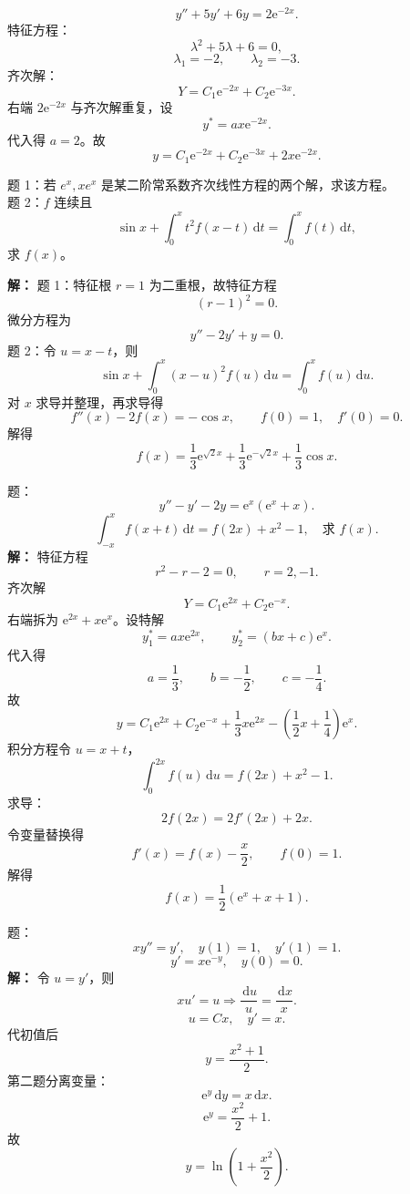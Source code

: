 \documentclass[11pt,a4paper,UTF8]{ctexart}
\newcommand{\dd}{\,\mathrm d}
\newcommand{\ee}{\mathrm e}
\begin{document}
\begin{answerbox}[例：2024--2025]
\[
y''+5y'+6y=2\ee^{-2x}.
\]
特征方程：
\[
\lambda^2+5\lambda+6=0,
\]
\[
\lambda_1=-2,\qquad \lambda_2=-3.
\]
齐次解：
\[
Y=C_1\ee^{-2x}+C_2\ee^{-3x}.
\]
右端 \(2\ee^{-2x}\) 与齐次解重复，设
\[
y^*=ax\ee^{-2x}.
\]
代入得 \(a=2\)。故
\[
\boxed{y=C_1\ee^{-2x}+C_2\ee^{-3x}+2x\ee^{-2x}.}
\]
\end{answerbox}

\newpage

\begin{answerbox}[2020--2021 简答 6 与积分方程大题]
题 1：若 \(e^x,xe^x\) 是某二阶常系数齐次线性方程的两个解，求该方程。\\
题 2：\(f\) 连续且
\[
\sin x+\int_0^x t^2f(x-t)\dd t=\int_0^x f(t)\dd t,
\]
求 \(f(x)\)。

\textbf{解：}
题 1：特征根 \(r=1\) 为二重根，故特征方程
\[
(r-1)^2=0.
\]
微分方程为
\[
\boxed{y''-2y'+y=0}.
\]
题 2：令 \(u=x-t\)，则
\[
\sin x+\int_0^x(x-u)^2f(u)\dd u=\int_0^x f(u)\dd u.
\]
对 \(x\) 求导并整理，再求导得
\[
f''(x)-2f(x)=-\cos x,\qquad f(0)=1,\quad f'(0)=0.
\]
解得
\[
\boxed{f(x)=\frac13\ee^{\sqrt2x}+\frac13\ee^{-\sqrt2x}+\frac13\cos x}.
\]
\end{answerbox}

\begin{answerbox}[2021--2022 计算 2、3：二阶非齐次与积分方程]
题：
\[
y''-y'-2y=\ee^x(\ee^x+x).
\]
\[
\int_{-x}^{x}f(x+t)\dd t=f(2x)+x^2-1,\quad \text{求 }f(x).
\]
\textbf{解：}
特征方程
\[
r^2-r-2=0,\qquad r=2,-1.
\]
齐次解
\[
Y=C_1\ee^{2x}+C_2\ee^{-x}.
\]
右端拆为 \(\ee^{2x}+x\ee^x\)。设特解
\[
y_1^*=a x\ee^{2x},\qquad y_2^*=(bx+c)\ee^x.
\]
代入得
\[
a=\frac13,\qquad b=-\frac12,\qquad c=-\frac14.
\]
故
\[
\boxed{y=C_1\ee^{2x}+C_2\ee^{-x}+\frac13x\ee^{2x}-\left(\frac12x+\frac14\right)\ee^x}.
\]
积分方程令 \(u=x+t\)，
\[
\int_0^{2x}f(u)\dd u=f(2x)+x^2-1.
\]
求导：
\[
2f(2x)=2f'(2x)+2x.
\]
令变量替换得
\[
f'(x)=f(x)-\frac x2,\qquad f(0)=1.
\]
解得
\[
\boxed{f(x)=\frac12(\ee^x+x+1)}.
\]
\end{answerbox}

\begin{answerbox}[2022--2023 简答 6 与 2023--2024 简答 6]
题：
\[
xy''=y',\quad y(1)=1,\quad y'(1)=1.
\]
\[
y'=x\ee^{-y},\quad y(0)=0.
\]
\textbf{解：}
令 \(u=y'\)，则
\[
xu'=u\Rightarrow \frac{\dd u}{u}=\frac{\dd x}{x}.
\]
\[
u=Cx,\quad y' = x.
\]
代初值后
\[
\boxed{y=\frac{x^2+1}{2}}.
\]
第二题分离变量：
\[
\ee^y\dd y=x\dd x.
\]
\[
\ee^y=\frac{x^2}{2}+1.
\]
故
\[
\boxed{y=\ln\left(1+\frac{x^2}{2}\right)}.
\]
\end{answerbox}
\end{document}

